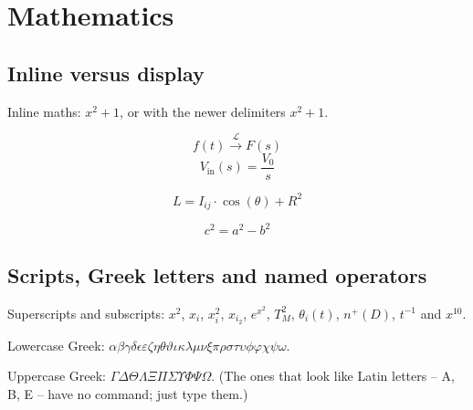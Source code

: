 \documentclass[11pt,a4paper]{article}
\theoremstyle{definition}                   %
\begin{document}
\section{Mathematics}

\subsection{Inline versus display}

Inline maths: $x^2 + 1$, or with the newer delimiters \(x^2 + 1\).

$$ f(t) \xrightarrow{\mathcal{L}} F(s) $$
\[ V_{\mathrm{in}}(s) = \frac{V_0}{s} \]

\begin{equation}
    L = I_{ij} \cdot \cos(\theta) + R^2
    \label{eq:sample}
\end{equation}

\begin{equation*}
    c^2 = a^2 - b^2
\end{equation*}

\subsection{Scripts, Greek letters and named operators}

Superscripts and subscripts: $x^2$, $x_i$, $x_i^2$, $x_{i_2}$, $e^{x^2}$,
$T_M^2$, $\theta_i(t)$, $n^+(D)$, $t^{-1}$ and $x^{10}$.

Lowercase Greek: $\alpha \beta \gamma \delta \epsilon \varepsilon \zeta \eta
\theta \vartheta \iota \kappa \lambda \mu \nu \xi \pi \rho \sigma \tau
\upsilon \phi \varphi \chi \psi \omega$.

Uppercase Greek: $\Gamma \Delta \Theta \Lambda \Xi \Pi \Sigma \Upsilon \Phi
\Psi \Omega$. (The ones that look like Latin letters -- A, B, E -- have no
command; just type them.)
\end{document}
